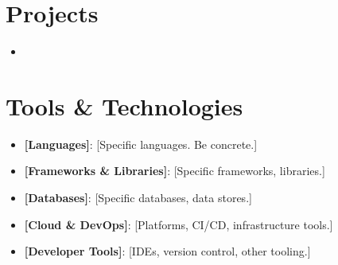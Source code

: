 \documentclass[11pt,a4paper,sans]{moderncv}
\begin{document}

\section{Projects}
\vspace{3pt}
\begin{itemize}

\item{}

\end{itemize}


\section{Tools \& Technologies}
\vspace{1pt}
\begin{itemize}

\item \textbf{[Languages]}: [Specific languages. Be concrete.]

\item \textbf{[Frameworks \& Libraries]}: [Specific frameworks, libraries.]

\item \textbf{[Databases]}: [Specific databases, data stores.]

\item \textbf{[Cloud \& DevOps]}: [Platforms, CI/CD, infrastructure tools.]

\item \textbf{[Developer Tools]}: [IDEs, version control, other tooling.]

\end{itemize}
\end{document}
